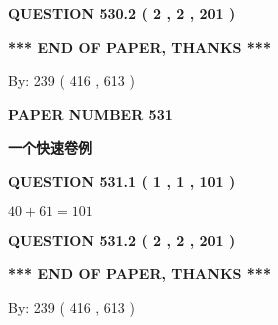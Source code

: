 \documentclass{ctexart}
\begin{document}
 
  
\vspace{0.2in}
  
{\textbf{\Large{QUESTION
530.2 
 ( 2 , 2 , 201 )
}}}
  
  
   
   
 \vspace{0.2in}
 
   
   
   
   
\vspace{1.0in} 
{\textbf{\large{ *** END OF PAPER, THANKS *** }}} 
   
   
\hspace{1.0in} By: 
 239 ( 416 ,  613 )
   
   
   
   
\newpage 
\setcounter{page}{ 
   531001 } 
   
   
   
   
 {\textbf{ \Large{ PAPER NUMBER  531  }}}
   
   
\vspace{0.2in}
   
   
   
   
   
   
 \vspace{0.2in}
{\LARGE {\textbf{ 一个快速卷例}}}
   
   
  
\vspace{0.2in}
  
{\textbf{\Large{QUESTION
531.1 
 ( 1 , 1 , 101 )
}}}
  
  
 
 

$ %
40 +  %
61=   %
101$
 
 
  
\vspace{0.2in}
  
{\textbf{\Large{QUESTION
531.2 
 ( 2 , 2 , 201 )
}}}
  
  
   
   
 \vspace{0.2in}
 
   
   
   
   
\vspace{1.0in} 
{\textbf{\large{ *** END OF PAPER, THANKS *** }}} 
   
   
\hspace{1.0in} By: 
 239 ( 416 ,  613 )
   
\end{document}
